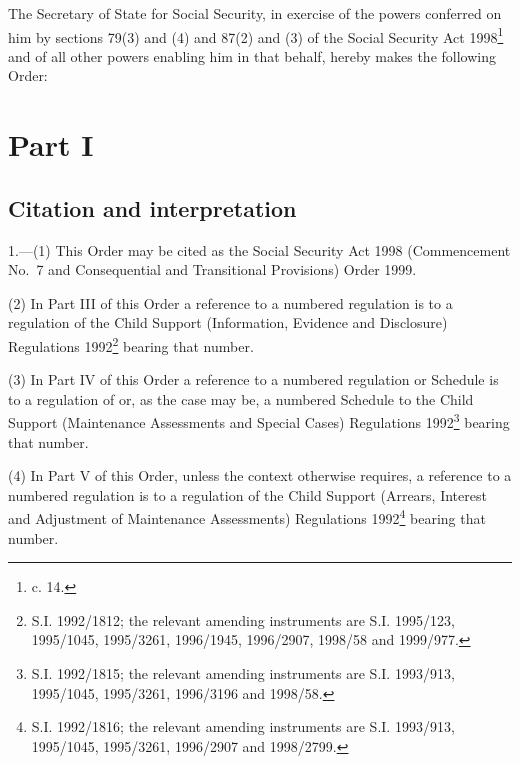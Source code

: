 \documentclass[12pt,a4paper]{article}
\title{\regstitle}
\author{S.I. 1999 No. 1510 (C.43)}
\date{Made 27th May 1999}
\begin{document}
\maketitle

\noindent
The Secretary of State for Social Security, in exercise of the powers conferred on him by sections 79(3) and (4) and 87(2) and (3) of the Social Security Act 1998\footnote{ c. 14.} and of all other powers enabling him in that behalf, hereby makes the following Order: 

{\sloppy

\tableofcontents

}

\bigskip

\setcounter{secnumdepth}{-2}

\section{Part I}

\renewcommand\parthead{--- Part I}

\subsection[1. Citation and interpretation]{Citation and interpretation}

1.—(1) This Order may be cited as the Social Security Act 1998 (Commencement No.\ 7 and Consequential and Transitional Provisions) Order 1999.

(2) In Part III of this Order a reference to a numbered regulation is to a regulation of the Child Support (Information, Evidence and Disclosure) Regulations 1992\footnote{\frenchspacing S.I. 1992/1812; the relevant amending instruments are S.I. 1995/123, 1995/1045, 1995/3261, 1996/1945, 1996/2907, 1998/58 and 1999/977.} bearing that number.

(3) In Part IV of this Order a reference to a numbered regulation or Schedule is to a regulation of or, as the case may be, a numbered Schedule to the Child Support (Maintenance Assessments and Special Cases) Regulations 1992\footnote{\frenchspacing S.I. 1992/1815; the relevant amending instruments are S.I. 1993/913, 1995/1045, 1995/3261, 1996/3196 and 1998/58.} bearing that number.

(4) In Part V of this Order, unless the context otherwise requires, a reference to a numbered regulation is to a regulation of the Child Support (Arrears, Interest and Adjustment of Maintenance Assessments) Regulations 1992\footnote{\frenchspacing S.I. 1992/1816; the relevant amending instruments are S.I. 1993/913, 1995/1045, 1995/3261, 1996/2907 and 1998/2799.} bearing that number.
\end{document}
